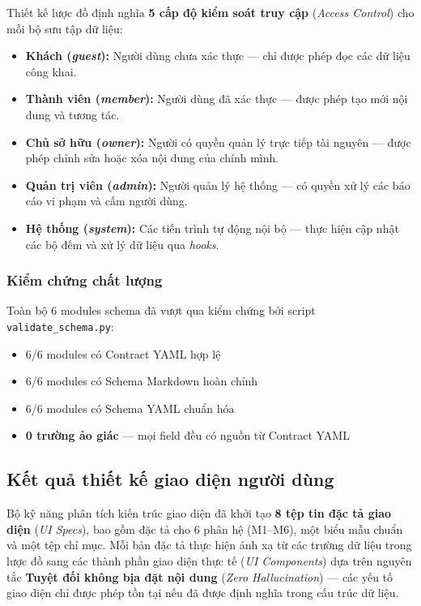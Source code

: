 \documentclass[13pt,a4paper,oneside]{extreport}
\numberwithin{equation}{chapter}
\numberwithin{figure}{chapter}
\numberwithin{table}{chapter}
\begin{document}
Thiết kế lược đồ định nghĩa \textbf{5 cấp độ kiểm soát truy cập} (\textit{Access Control}) cho mỗi bộ sưu tập dữ liệu:

\begin{itemize}
    \item \textbf{Khách (\textit{guest}):} Người dùng chưa xác thực — chỉ được phép đọc các dữ liệu công khai.
    \item \textbf{Thành viên (\textit{member}):} Người dùng đã xác thực — được phép tạo mới nội dung và tương tác.
    \item \textbf{Chủ sở hữu (\textit{owner}):} Người có quyền quản lý trực tiếp tài nguyên — được phép chỉnh sửa hoặc xóa nội dung của chính mình.
    \item \textbf{Quản trị viên (\textit{admin}):} Người quản lý hệ thống — có quyền xử lý các báo cáo vi phạm và cấm người dùng.
    \item \textbf{Hệ thống (\textit{system}):} Các tiến trình tự động nội bộ — thực hiện cập nhật các bộ đếm và xử lý dữ liệu qua \textit{hooks}.
\end{itemize}

\subsubsection{Kiểm chứng chất lượng}

Toàn bộ 6 modules schema đã vượt qua kiểm chứng bởi script \texttt{validate\_schema.py}:
\begin{itemize}
    \item 6/6 modules có Contract YAML hợp lệ
    \item 6/6 modules có Schema Markdown hoàn chỉnh
    \item 6/6 modules có Schema YAML chuẩn hóa
    \item \textbf{0 trường ảo giác} — mọi field đều có nguồn từ Contract YAML
\end{itemize}

\subsection{Kết quả thiết kế giao diện người dùng}

Bộ kỹ năng phân tích kiến trúc giao diện đã khởi tạo \textbf{8 tệp tin đặc tả giao diện} (\textit{UI Specs}), bao gồm đặc tả cho 6 phân hệ (M1--M6), một biểu mẫu chuẩn và một tệp chỉ mục. Mỗi bản đặc tả thực hiện ánh xạ từ các trường dữ liệu trong lược đồ sang các thành phần giao diện thực tế (\textit{UI Components}) dựa trên nguyên tắc \textbf{Tuyệt đối không bịa đặt nội dung} (\textit{Zero Hallucination}) — các yếu tố giao diện chỉ được phép tồn tại nếu đã được định nghĩa trong cấu trúc dữ liệu.
\end{document}
